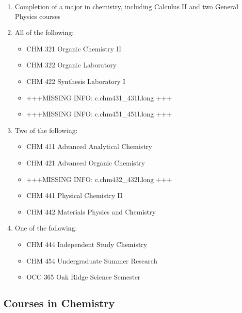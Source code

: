 \documentclass[
  letterpaper,
]{scrbook}
\providecommand{\tightlist}{%
  \setlength{\itemsep}{0pt}\setlength{\parskip}{0pt}}
\begin{document}
\begin{enumerate}
\def\labelenumi{\arabic{enumi}.}
\item
  Completion of a major in chemistry, including Calculus II and two
  General Physics courses
\item
  All of the following:

  \begin{itemize}
  \tightlist
  \item
    CHM 321 Organic Chemistry II
  \item
    CHM 322 Organic Laboratory
  \item
    CHM 422 Synthesis Laboratory I
  \item
    +++MISSING INFO: c.chm431\_431l.long +++
  \item
    +++MISSING INFO: c.chm451\_451l.long +++
  \end{itemize}
\item
  Two of the following:

  \begin{itemize}
  \tightlist
  \item
    CHM 411 Advanced Analytical Chemistry
  \item
    CHM 421 Advanced Organic Chemistry
  \item
    +++MISSING INFO: c.chm432\_432l.long +++
  \item
    CHM 441 Physical Chemistry II
  \item
    CHM 442 Materials Physics and Chemistry
  \end{itemize}
\item
  One of the following:

  \begin{itemize}
  \tightlist
  \item
    CHM 444 Independent Study Chemistry
  \item
    CHM 454 Undergraduate Summer Research
  \item
    OCC 365 Oak Ridge Science Semester
  \end{itemize}
\end{enumerate}

\subsection{Courses in Chemistry}\label{courses-in-chemistry}
\end{document}
